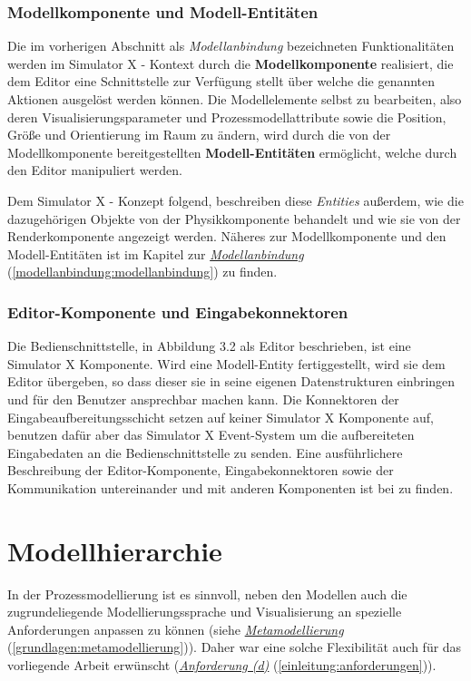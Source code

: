 \documentclass[a4paper,10pt]{sphinxmanual}
\begin{document}
\subsection{Modellkomponente und Modell-Entitäten}
\label{ipm3d:modellkomponente-und-modell-entitaten}
Die im vorherigen Abschnitt als \emph{Modellanbindung} bezeichneten Funktionalitäten werden im Simulator X - Kontext durch die \textbf{Modellkomponente} realisiert, die dem Editor eine Schnittstelle zur Verfügung stellt über welche die genannten Aktionen ausgelöst werden können.
Die Modellelemente selbst zu bearbeiten, also deren Visualisierungsparameter und Prozessmodellattribute sowie die Position, Größe und Orientierung im Raum zu ändern, wird durch die von der Modellkomponente bereitgestellten \textbf{Modell-Entitäten} ermöglicht, welche durch den Editor manipuliert werden.

Dem Simulator X - Konzept folgend, beschreiben diese \emph{Entities} außerdem, wie die dazugehörigen Objekte von der Physikkomponente behandelt und wie sie von der Renderkomponente angezeigt werden.
Näheres zur Modellkomponente und den Modell-Entitäten ist im Kapitel zur {\hyperref[modellanbindung:modellanbindung]{\emph{Modellanbindung}}} (\autoref*{modellanbindung:modellanbindung}) zu finden.


\subsection{Editor-Komponente und Eingabekonnektoren}
\label{ipm3d:editor-komponente-und-eingabekonnektoren}
Die Bedienschnittstelle, in Abbildung 3.2 als Editor beschrieben, ist eine Simulator X Komponente.
Wird eine Modell-Entity fertiggestellt, wird sie dem Editor übergeben, so dass dieser sie in seine eigenen Datenstrukturen einbringen und für den Benutzer ansprechbar machen kann.
Die Konnektoren der Eingabeaufbereitungsschicht setzen auf keiner Simulator X Komponente auf, benutzen dafür aber das Simulator X Event-System um die aufbereiteten Eingabedaten an die Bedienschnittstelle zu senden.
Eine ausführlichere Beschreibung der Editor-Komponente, Eingabekonnektoren sowie der Kommunikation untereinander und mit anderen Komponenten ist bei \cite{uli} zu finden.


\chapter{Modellhierarchie}
\label{modellhierarchie:modellhierarchie}\label{modellhierarchie::doc}\label{modellhierarchie:id1}
In der Prozessmodellierung ist es sinnvoll, neben den Modellen auch die zugrundeliegende Modellierungssprache und Visualisierung an spezielle Anforderungen anpassen zu können (siehe {\hyperref[grundlagen:metamodellierung]{\emph{Metamodellierung}}} (\autoref*{grundlagen:metamodellierung})). Daher war eine solche Flexibilität auch für das vorliegende Arbeit erwünscht ({\hyperref[einleitung:anforderungen]{\emph{Anforderung (d)}}} (\autoref*{einleitung:anforderungen})).
\end{document}
